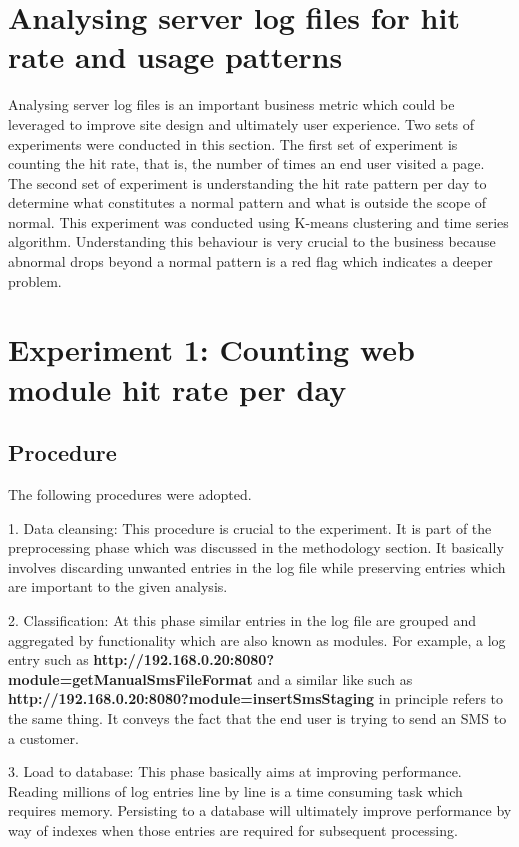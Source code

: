 \documentclass[12pt, letterpaper, titlepage]{report}
\begin{document}
\section{Analysing server log files for hit rate and usage patterns}
Analysing server log files is an important business metric which could be leveraged to improve site design and ultimately user experience. Two sets of experiments were conducted in this section. The first set of experiment is counting the hit rate, that is, the number of times an end user visited a page. The second set of experiment is understanding the hit rate pattern per day to determine what constitutes a normal pattern and what is outside the scope of normal. This experiment was conducted using K-means clustering and time series algorithm. Understanding this behaviour is very crucial to the business because abnormal drops beyond a normal pattern is a red flag which indicates a deeper problem.

\section{Experiment 1: Counting web module hit rate per day}
\subsection{Procedure}
The following procedures were adopted.

1. Data cleansing: This procedure is crucial to the experiment. It is part of the preprocessing phase which was discussed in the methodology section. It basically involves discarding unwanted entries in the log file while preserving entries which are important to the given analysis.

2. Classification: At this phase similar entries in the log file are grouped and aggregated by functionality which are also known as modules. For example, a log entry such as \textbf{http://192.168.0.20:8080?module=getManualSmsFileFormat} and a similar like such as \textbf{http://192.168.0.20:8080?module=insertSmsStaging} in principle refers to the same thing. It conveys the fact that the end user is trying to send an SMS to a customer.

3. Load to database: This phase basically aims at improving performance. Reading millions of log entries line by line is a time consuming task which requires memory. Persisting to a database will ultimately improve performance by way of indexes when those entries are required for subsequent processing.\\\\
\end{document}
